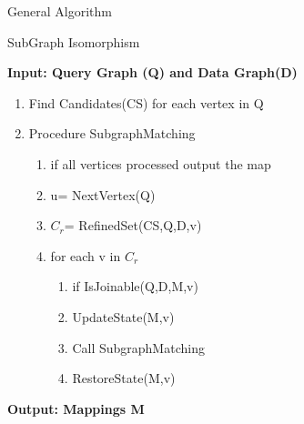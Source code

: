 \documentclass{beamer}
\begin{document}
\begin{frame}{General Algorithm}

    \begin{algorithm}[H]
    \caption{SubGraph Isomorphism}
    \textbf{Input: Query Graph (Q) and Data Graph(D)}
     \begin{enumerate}
           \item Find Candidates(CS) for each vertex in Q
            \item Procedure SubgraphMatching
            \begin{enumerate}
                \item   if all vertices processed output the map
                \item u= NextVertex(Q)
                \item $C_r$= RefinedSet(CS,Q,D,v)
                \item for each v in $C_r$
                \begin{enumerate}
                    \item if IsJoinable(Q,D,M,v)
                    \item UpdateState(M,v)
                    \item Call SubgraphMatching
                    \item RestoreState(M,v)
                \end{enumerate}
            \end{enumerate}
        \end{enumerate}
        \textbf{Output: Mappings M}
    \end{algorithm}
      
     
    
           
\end{frame}
\end{document}
